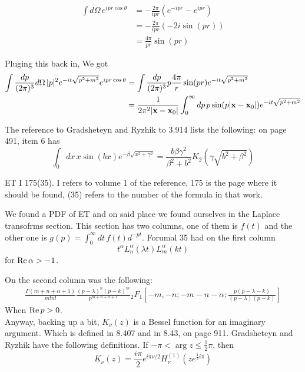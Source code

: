 \begin{align*}
\int d\Omega \, e^{ipr\cos\theta} &= 
    -\frac{2\pi}{ipr} \left( e^{-ipr} - e^{ipr} \right) \\
&= -\frac{2\pi}{ipr} \left(-2i \sin(pr) \right) \\
&= \frac{4\pi}{pr} \sin(pr)
\end{align*}

Pluging this back in,
We got
\begin{align}
\int \frac{dp}{(2\pi)^3} d\Omega \, |p|^2 e^{-it\sqrt{p^2 + m^2}} e^{ipr\cos\theta} &=
\int \frac{dp}{(2\pi)^3} p \frac{4\pi}{r} \sin(pr) e^{-it\sqrt{p^2 + m^2}} \\
&= \frac{1}{2\pi^2 |\boldsymbol{\mathbf{x}}-\boldsymbol{\mathbf{x}}_0|}
    \int_{0}^{\infty} dp \, p \sin(p|\boldsymbol{\mathbf{x}}-\boldsymbol{\mathbf{x}}_0|) e^{-it\sqrt{p^2 + m^2}} \label{kg-relativistic-simplified}
\end{align}

The reference to Gradsheteyn and Ryzhik to 3.914 lists the following: on page 491, item 6 has
\begin{equation}
\int_{0} dx\, x \sin(bx) e^{-\beta \sqrt{x^2 + \gamma^2}} =
    \frac{b \beta \gamma^2}{\beta^2 + b^2} K_2\left(\gamma \sqrt{b^2 + \beta^2}\right) \label{Gradsheteyn-kg-relativistic}
\end{equation}

ET I 175(35).
I refers to volume 1 of the reference, 175 is the page where it should be found, (35) refers to the number of the formula
in that work.

We found a PDF of ET and on said place we found ourselves in the Laplace transofrms section.
This section has two columns, one of them is $f(t)$ and the other one is $g(p) = \int_{0}^{\infty} dt\, f(t) d^{-pt}$.
Forumal 35 had on the first column
$$
t^\alpha L_{n}^{\alpha} (\lambda t) L_{m}^{\alpha} (k t)
$$
for $\operatorname{Re}{\alpha} > -1$.

On the second column was the following:
\begin{align*}
\frac{\Gamma(m+n+\alpha + 1)}{m! n!}
\frac{(p-\lambda)^n (p-k)^m}{p^{m+n+\alpha +1}}
{}_{2}F_{1} \left[ -m, -n; -m-n-\alpha; \frac{p(p-\lambda -k)}{(p-\lambda)(p-k)} \right]
\end{align*}
When $\operatorname{Re}{p} > 0$.
\\

Anyway, backing up a bit, $K_\nu (z)$ is a Bessel function for an imaginary argument.
Which is defined in 8.407 and in 8.43, on page 911.
Gradsheteyn and Ryzhik have the following definitions.
If $-\pi < \arg{z} \leq \frac{1}{2}\pi$, then
$$
K_\nu (z) = \frac{i\pi}{2} e^{i\pi\nu /2} H_{\nu}^{(1)} \left(z e^{\frac{1}{2} i\pi} \right)
$$

